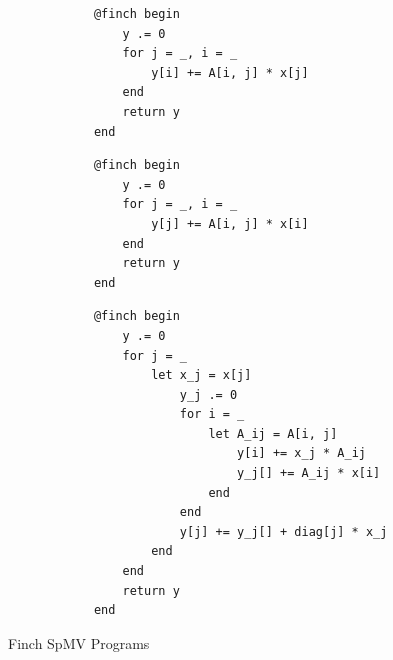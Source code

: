 \begin{figure}
    \begin{minipage}[t]{0.315\textwidth}
        \vspace{0pt} %
        \begin{verbatim}
            @finch begin
                y .= 0
                for j = _, i = _
                    y[i] += A[i, j] * x[j]
                end
                return y
            end
        \end{verbatim}
    \end{minipage}%
    \begin{minipage}[t]{0.315\textwidth}
        \vspace{0pt} %
        \begin{verbatim}
            @finch begin
                y .= 0
                for j = _, i = _
                    y[j] += A[i, j] * x[i]
                end
                return y
            end
        \end{verbatim}
    \end{minipage}
    \begin{minipage}[t]{0.36\textwidth}
        \vspace{0pt} %
        \begin{verbatim}
            @finch begin
                y .= 0
                for j = _
                    let x_j = x[j]
                        y_j .= 0
                        for i = _
                            let A_ij = A[i, j]
                                y[i] += x_j * A_ij
                                y_j[] += A_ij * x[i]
                            end
                        end
                        y[j] += y_j[] + diag[j] * x_j
                    end
                end
                return y
            end
        \end{verbatim}
    \end{minipage}
    \caption{Finch  SpMV Programs}
    \label{spmv_programs}
\end{figure}



